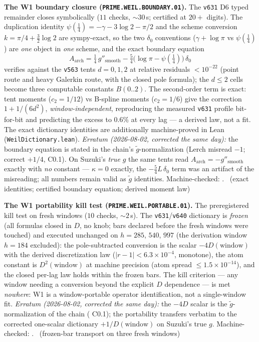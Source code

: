 \documentclass[11pt,a4paper]{article}
\theoremstyle{definition}
\begin{document}
\par\smallskip\noindent\textbf{The W1 boundary closure
(\texttt{PRIME.WEIL.BOUNDARY.01}).}
The \texttt{v631} D6 typed remainder closes symbolically ($11$ checks,
${\sim}30$\,s; certified at $20{+}$ digits).  The duplication identity
$\psi(\tfrac14)=-\gamma-3\log2-\pi/2$ and the scheme conversion
$k=\pi/4+\tfrac32\log2$ are sympy-exact, so the two $\delta_0$
conventions ($\gamma{+}\log\pi$ vs $\psi(\tfrac14)$) are \emph{one}
object in \emph{one} scheme, and the exact boundary equation
\[
A_{\mathrm{arch}}
 =\tfrac14\,g''_{\mathrm{smooth}}
 -\tfrac54\bigl(\log\pi-\psi(\tfrac14)\bigr)\,\delta_0
\]
verifies against the \texttt{v563} tents $d=0,1,2$ at relative
residuals $<10^{-22}$ (point route and heavy Galerkin route, with the
closed pole formula); the $d\le2$ cells become three computable
constants $B(0..2)$.  The second-order term is exact: tent moments
($c_2=1/12$) vs B-spline moments ($c_2=1/6$) give the correction
$1+1/(6d^2)$, \emph{window-independent}, reproducing the measured
\texttt{v631} profile bit-for-bit and predicting the excess to $0.6\%$
at every lag --- a derived law, not a fit.  The exact dictionary
identities are additionally machine-proved in Lean
(\texttt{WeilDictionary.lean}).
\emph{Erratum (2026-08-02, corrected the same day):} the boundary
equation is stated in the chain's $\tilde g$-normalization (Lerch
misread $-1$; correct $+1/4$,  C0.1).  On
Suzuki's \emph{true} $g$ the same tents read
$A_{\mathrm{arch}}=-g''_{\mathrm{smooth}}$ exactly with \emph{no}
constant --- $\kappa=0$ exactly, the $-\tfrac54 L\,\delta_0$ term was
an artifact of the misreading; all numbers remain valid as $\tilde g$
identities.
Machine-checked: .
\mE\ (exact identities; certified boundary equation; derived moment
law)
\par\smallskip

\par\smallskip\noindent\textbf{The W1 portability kill test
(\texttt{PRIME.WEIL.PORTABLE.01}).}
The preregistered kill test on fresh windows ($10$ checks,
${\sim}2$\,s).  The \texttt{v631}/\texttt{v640} dictionary is
\emph{frozen} (all formulas closed in $D$, no knob; bars declared
before the fresh windows were touched) and executed unchanged on
$h=285$, $540$, $997$ (the derivation window $h=184$ excluded): the
pole-subtracted conversion is the scalar $-4D(\text{window})$ with the
derived discretization law ($|r-1|<6.3\times10^{-4}$, monotone), the
atom constant is $D^2(\text{window})$ at machine precision (atom
spread $\le1.5\times10^{-14}$), and the closed per-lag law holds
within the frozen bars.  The kill criterion --- any window needing a
conversion beyond the explicit $D$ dependence --- is met
\emph{nowhere}: W1 is a window-portable operator identification, not a
single-window fit.
\emph{Erratum (2026-08-02, corrected the same day):} the $-4D$ scalar
is the $\tilde g$-normalization of the chain
( C0.1); the portability transfers verbatim
to the corrected one-scalar dictionary $+1/D(\text{window})$ on
Suzuki's true $g$.
Machine-checked: .
\mE\ (frozen-bar transport on three fresh windows)
\par\smallskip
\end{document}
